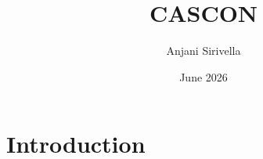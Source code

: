 \documentclass{article}
\title{CASCON}
\author{Anjani Sirivella}
\date{June 2026}
\begin{document}
\maketitle

\section{Introduction}
\end{document}
